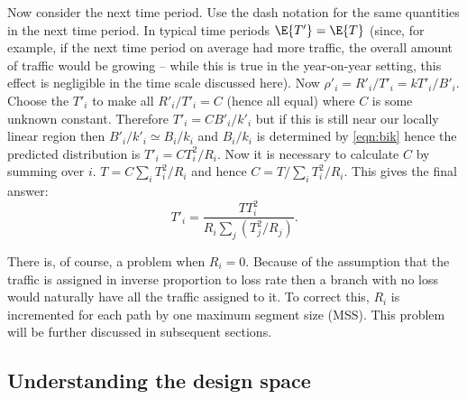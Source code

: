 Now consider the next time period.  
Use the dash notation for the same quantities in the next time period.  
In typical time periods $\E{T'} = \E{T}$ (since, for example, if the next time period on average had more traffic, the overall amount of traffic would be growing -- while this is true in the year-on-year setting, this effect is negligible in the time scale discussed here). 
Now $\rho'_i = R'_i/T'_i = k T'_i/B'_i$.  
Choose the $T'_i$ to make all $R'_i/T'_i = C$ (hence all equal) where $C$ is some unknown constant.  
Therefore $T'_i = C B'_i/k'_i$ but if this is still near our locally linear region then $B'_i/k'_i \simeq B_i/k_i$ and $B_i/k_i$ is determined by \eqref{eqn:bik} hence the predicted distribution is $ T'_i = C T_i^2/R_i$.  
Now it is necessary to calculate $C$ by summing over $i$.  
$T = C \sum_i T_i^2/R_i$ and hence $C = T/\sum_i T_i^2/R_i$.
This gives the final answer:
\begin{equation}
T'_i = \frac{T T_i^2}{R_i \sum_j (T_j^2/R_j)}.
\label{eqn:routesplitloss}
\end{equation}

There is, of course, a problem when $R_i = 0$.  
Because of the assumption that the traffic is assigned in inverse proportion to loss rate then a branch with no loss would naturally have all the traffic assigned to it. To correct this, $R_i$ is incremented for each path by one maximum segment size (MSS). 
This problem will be further discussed in subsequent sections.

\subsection{Understanding the design space}

